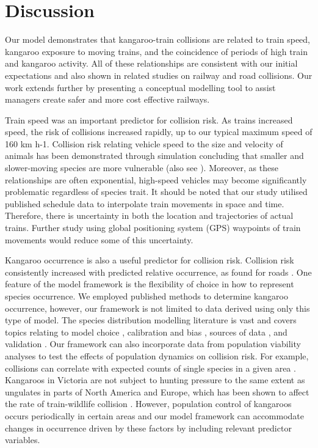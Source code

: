 \section{Discussion}

Our model demonstrates that kangaroo-train collisions are related to train speed, kangaroo exposure to moving trains, and the coincidence of periods of high train and kangaroo activity.  All of these relationships are consistent with our initial expectations and also shown in related studies on railway \citep{gund98} and road \citep{lao11,roge12} collisions. Our work extends further by presenting a conceptual modelling tool to assist managers create safer and more cost effective railways.

Train speed was an important predictor for collision risk.  As trains increased speed, the risk of collisions increased rapidly, up to our typical maximum speed of 160 km h-1.  Collision risk relating vehicle speed to the size and velocity of animals has been demonstrated through simulation \citep{jaar06} concluding that smaller and slower-moving species are more vulnerable (also see \cite{fahr09}). Moreover, as these relationships are often exponential, high-speed vehicles may become significantly problematic regardless of species trait. It should be noted that our study utilised published schedule data to interpolate train movements in space and time. Therefore, there is uncertainty in both the location and trajectories of actual trains. Further study using global positioning system (GPS) waypoints of train movements would reduce some of this uncertainty.

Kangaroo occurrence is also a useful predictor for collision risk. Collision risk consistently increased with predicted relative occurrence, as found for roads \citep{lao11,roge09}.  One feature of the model framework is the flexibility of choice in how to represent species occurrence.  We employed published methods to determine kangaroo occurrence, however, our framework is not limited to data derived using only this type of model.  The species distribution modelling literature is vast and covers topics relating to model choice \citep{guil15}, calibration and bias \citep{phil10}, sources of data \citep{vans13}, and validation \citep{chiv14}.  Our framework can also incorporate data from population viability analyses to test the effects of population dynamics on collision risk. For example, collisions can correlate with expected counts of single species in a given area \citep{skor13}.  Kangaroos in Victoria are not subject to hunting pressure to the same extent as ungulates in parts of North America and Europe, which has been shown to affect the rate of train-wildlife collision \citep{seil05}.  However, population control of kangaroos occurs periodically in certain areas and our model framework can accommodate changes in occurrence driven by these factors by including relevant predictor variables. 

